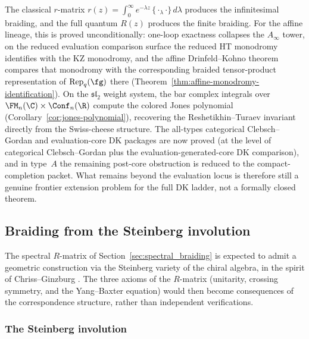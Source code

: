 \begin{remark}
\label{rem:dk-kontsevich}
The classical $r$-matrix
$r(z) = \int_0^\infty e^{-\lambda z}\,\{{\cdot}_\lambda{\cdot}\}
\,d\lambda$ produces the infinitesimal braiding, and the full quantum $R(z)$ produces the finite braiding. For the affine lineage, this is proved unconditionally: one-loop exactness collapses the $A_\infty$ tower, on the reduced evaluation comparison surface the reduced HT monodromy identifies with the KZ monodromy, and the affine Drinfeld--Kohno theorem compares that monodromy with the corresponding braided tensor-product representation of $\mathrm{Rep}_q(\fg)$ there (Theorem~\ref{thm:affine-monodromy-identification}). On the $\mathfrak{sl}_2$ weight system, the bar complex integrals over $\FM_n(\C) \times \Conf_n(\R)$ compute the colored Jones polynomial (Corollary~\ref{cor:jones-polynomial}), recovering the Reshetikhin--Turaev invariant directly from the Swiss-cheese structure. The all-types categorical Clebsch--Gordan and
evaluation-core DK packages are now proved
(at the level of categorical Clebsch--Gordan plus the
evaluation-generated-core DK comparison), and in type~$A$ the
remaining post-core obstruction is reduced to the compact-completion
packet.
What remains beyond the evaluation locus is therefore still a genuine
frontier extension problem for the full DK ladder, not a formally
closed theorem.
\end{remark}

\subsection{Braiding from the Steinberg involution}
\label{subsec:braiding-steinberg-involution}

\providecommand{\Steinberg}{\mathfrak{S}}
\providecommand{\Mvac}{{\mathcal{M}_{\mathrm{vac}}}}

The spectral $R$-matrix of Section~\ref{sec:spectral_braiding}
is expected to admit a geometric construction via the Steinberg variety of the
chiral algebra, in the spirit of Chriss--Ginzburg
\cite{ChrissGinzburg}. The three axioms of the $R$-matrix (unitarity,
crossing symmetry, and the Yang--Baxter equation) would then become
consequences of the correspondence structure, rather than
independent verifications.

\subsubsection{The Steinberg involution}

